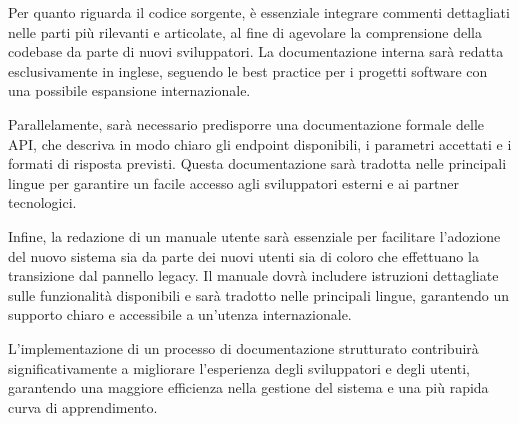 Per quanto riguarda il codice sorgente, è essenziale integrare commenti dettagliati nelle parti più rilevanti e articolate, al fine di agevolare la comprensione della codebase da parte di nuovi sviluppatori. La documentazione interna sarà redatta esclusivamente in inglese, seguendo le best practice per i progetti software con una possibile espansione internazionale.

Parallelamente, sarà necessario predisporre una documentazione formale delle API, che descriva in modo chiaro gli endpoint disponibili, i parametri accettati e i formati di risposta previsti. Questa documentazione sarà tradotta nelle principali lingue per garantire un facile accesso agli sviluppatori esterni e ai partner tecnologici.

Infine, la redazione di un manuale utente sarà essenziale per facilitare l’adozione del nuovo sistema sia da parte dei nuovi utenti sia di coloro che effettuano la transizione dal pannello legacy. Il manuale dovrà includere istruzioni dettagliate sulle funzionalità disponibili e sarà tradotto nelle principali lingue, garantendo un supporto chiaro e accessibile a un’utenza internazionale.

L’implementazione di un processo di documentazione strutturato contribuirà significativamente a migliorare l’esperienza degli sviluppatori e degli utenti, garantendo una maggiore efficienza nella gestione del sistema e una più rapida curva di apprendimento.
